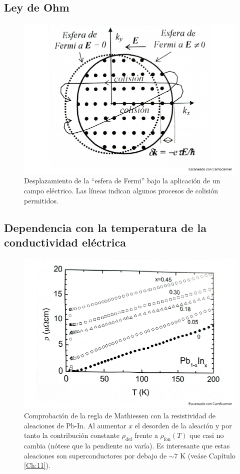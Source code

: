 \subsection{Ley de Ohm}
\begin{figure}[h!] \centering
    \includegraphics[scale=0.5]{Cuerpo/Ch_06/Fotos libro 5.pdf}
    \caption{Desplazamiento de la ``esfera de Fermi'' bajo la aplicación de un campo eléctrico. Las líneas indican algunos procesos de colisión permitidos.}
    \label{Fig:06-05}
\end{figure}  

\subsection{Dependencia con la temperatura de la conductividad eléctrica}
\begin{figure}[h!] \centering
    \includegraphics[scale=0.5]{Cuerpo/Ch_06/Fotos libro 6.pdf}
    \caption{Comprobación de la regla de Mathiessen con la resistividad de aleaciones de Pb-In. Al aumentar $x$ el desorden de la aleación y por tanto la contribución constante $\rho_{\text{def}}$ frente a $\rho_{\text{fon}} (T)$ que casi no cambia (nótese que la pendiente no varía). Es interesante que estas aleaciones son superconductores por debajo de $\sim 7$ K (veáse Capítulo \ref{Ch:11}).}
    \label{Fig:06-06}
\end{figure}  


